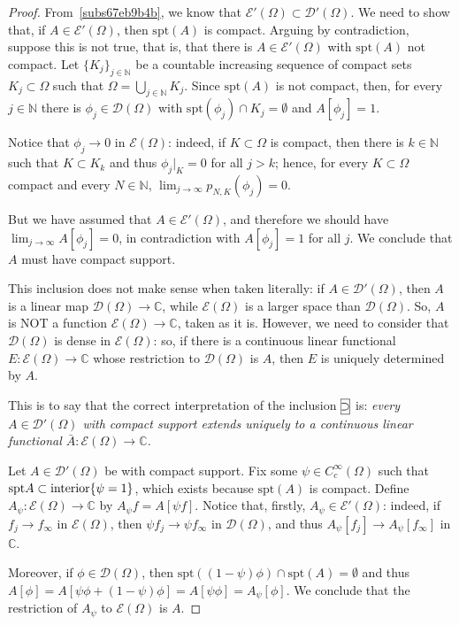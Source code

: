 \documentclass[a4paper,9pt]{amsart}
\newcommand{\scr}[1]{\mathscr{#1}}
\newcommand{\N}{\mathbb{N}}	%
\newcommand{\C}{\mathbb{C}}	%
\newcommand{\ci}{\framebox[\width]{$\subset$} }
\newcommand{\ic}{\framebox[\width]{$\supset$} }
\newcommand{\spt}{\mathrm{spt}}
\theoremstyle{plain}
\theoremstyle{definition}
\theoremstyle{remark}
\begin{document}
\begin{proof}
	\ci
	From~\ref{subs67eb9b4b}, we know that $\scr E'(\Omega)\subset\scr D'(\Omega)$.
	We need to show that, if $A\in\scr E'(\Omega)$, then $\spt(A)$ is compact.
	Arguing by contradiction, suppose this is not true, that is, that there is $A\in\scr E'(\Omega)$ with $\spt(A)$ not compact.
	Let $\{K_j\}_{j\in\N}$ be a countable increasing sequence of compact sets $K_j\subset\Omega$ 
	such that $\Omega = \bigcup_{j\in\N} K_j$.
	Since $\spt(A)$ is not compact, then, for every $j\in\N$ there is $\phi_j\in\scr D(\Omega)$ with $\spt(\phi_j)\cap K_j=\emptyset$ and $A[\phi_j]=1$.

	Notice that $\phi_j\to0$ in $\scr E(\Omega)$:
	indeed, if $K\subset\Omega$ is compact, then there is $k\in\N$ such that $K\subset K_k$ and thus $\phi_j|_K=0$ for all $j>k$;
	hence, for every $K\subset\Omega$ compact and every $N\in\N$, 
	$\lim_{j\to\infty} p_{N,K}(\phi_j)= 0$.
	
	But we have assumed that $A\in\scr E'(\Omega)$, and therefore we should have $\lim_{j\to\infty} A[\phi_j] = 0$, in contradiction with $A[\phi_j]=1$ for all $j$.
	We conclude that $A$ must have compact support.
	
	\ic
	This inclusion does not make sense when taken literally:
	if $A\in\scr D'(\Omega)$, then $A$ is a linear map $\scr D(\Omega)\to\C$, while $\scr E(\Omega)$ is a larger space than $\scr D(\Omega)$.
	So, $A$ is NOT a function $\scr E(\Omega)\to\C$, taken as it is.
	However, we need to consider that $\scr D(\Omega)$ is dense in $\scr E(\Omega)$:
	so, if there is a continuous linear functional $E:\scr E(\Omega)\to\C$ whose restriction to $\scr D(\Omega)$ is $A$, then $E$ is uniquely determined by $A$.
	
	This is to say that the correct interpretation of the inclusion $\ic$ is:
	{\it every $A\in\scr D'(\Omega)$ with compact support extends uniquely to a continuous linear functional $\bar A:\scr E(\Omega)\to\C$.}
	
	Let $A\in\scr D'(\Omega)$ be with compact support.
	Fix some $\psi\in C^\infty_c(\Omega)$ such that $\spt A \subset{\rm interior}\{\psi=1\}$, which exists because $\spt(A)$ is compact.
	Define $A_\psi:\scr E(\Omega)\to\C$ by $A_\psi f = A[\psi f]$.
	Notice that, firstly, $A_\psi\in\scr E'(\Omega)$:
	indeed, if $f_j\to f_\infty$ in $\scr E(\Omega)$, then $\psi f_j\to \psi f_\infty$ in $\scr D(\Omega)$, and thus $A_\psi[f_j] \to A_\psi[f_\infty]$ in $\C$.
	
	Moreover, if $\phi\in\scr D(\Omega)$, then $\spt((1-\psi)\phi) \cap\spt(A)=\emptyset$ and thus
	$A[\phi] = A[\psi\phi + (1-\psi)\phi] = A[\psi\phi] = A_\psi[\phi]$.
	We conclude that the restriction of $A_\psi$ to $\scr E(\Omega)$ is $A$.
%	
%	
\end{proof}
\end{document}

